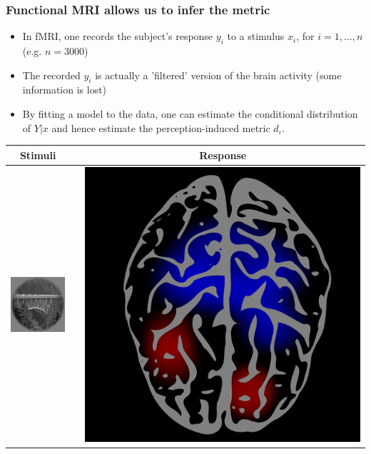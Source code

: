 \documentclass{beamer}
\begin{document}
\begin{frame}
\frametitle{Functional MRI allows us to infer the metric}
\begin{itemize}
\item In fMRI, one records the subject's response $y_i$ to a stimulus $x_i$,
for $i = 1,\hdots, n$ (e.g. $n = 3000$)
\item The recorded $y_i$ is actually a 'filtered' version of the brain activity (some information is lost)
\item By fitting a model to the data, one can estimate the conditional distribution of $Y|x$ and hence estimate the perception-induced metric $d_\iota$.
\end{itemize}
\begin{center}
\begin{tabular}{ccc}
\hline
Stimuli & & Response\\ \hline
\includegraphics[scale = .3]{img1.png} & \hspace{1in} & \includegraphics[scale = 0.035]{brain1.png} \\ \hline

\end{tabular}
\end{center}
\end{frame}
\end{document}
